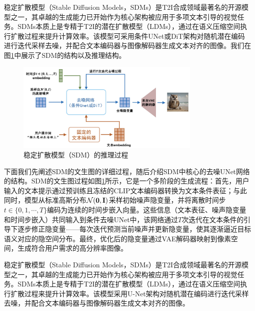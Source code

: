 \documentclass[11pt,a4paper,UTF8]{ctexart}
\begin{document}
稳定扩散模型（Stable Diffusion Models，SDMs）\cite{rombach2022high}是T2I合成领域最著名的开源模型之一，其卓越的生成能力已开始作为核心架构被应用于多项文本引导的视觉任务\cite{blattmann2023videoldm,brooks2023instructpix2pix,wang2023score,zhang2023adding}。SDMs本质上是专精于T2I的潜在扩散模型（LDMs）\cite{rombach2022high}，通过在语义压缩空间执行扩散过程\cite{ho2022classifier,liu2021pseudo,song2020denoising}来提升计算效率。该模型可采用条件UNet或DiT架构对随机潜在编码进行迭代采样去噪，并配合文本编码器\cite{radford2021learning}与图像解码器\cite{esser2021taming,van2017neural}生成文本对齐的图像。我们在图\ref{fig:sdm}中展示了SDM的结构以及推理结构。

\begin{figure}[htbp]
\centering
\includegraphics[width=0.8\textwidth]{img/SDM.jpg}
\caption{稳定扩散模型（SDM）的推理过程}
\label{fig:sdm}
\end{figure}

下面我们先阐述SDM的文生图的详细过程，随后介绍SDM中核心的去噪UNet网络的结构。SDM的文生图过程如图\ref{fig:sdm}所示，它是一个多阶段的生成流程：首先，用户输入的文本提示通过预训练且冻结的CLIP文本编码器转换为文本条件表征；与此同时，模型从标准高斯分布$\mathcal{N}(\mathbf{0},\mathbf{I})$采样初始噪声隐变量，并将离散时间步$t\in\{0,1,\cdots,T\}$编码为连续的时间步嵌入向量。这些信息（文本表征、噪声隐变量和时间步嵌入）共同输入到条件去噪UNet中，该网络通过$T$次迭代在文本条件的引导下逐步修正隐变量——每次迭代预测当前噪声并更新隐变量，使其逐渐逼近目标语义对应的隐空间分布。最终，优化后的隐变量通过VAE解码器映射到像素空间，生成符合用户需求的高分辨率图像。



\newpage

\iffalse
稳定扩散模型（Stable Diffusion Models，SDMs）\cite{rombach2022high}是T2I合成领域最著名的开源模型之一，其卓越的生成能力已开始作为核心架构被应用于多项文本引导的视觉任务\cite{blattmann2023videoldm,brooks2023instructpix2pix,wang2023score,zhang2023adding}。SDMs本质上是专精于T2I的潜在扩散模型（LDMs）\cite{rombach2022high}，通过在语义压缩空间执行扩散过程\cite{ho2022classifier,liu2021pseudo,song2020denoising}来提升计算效率。该模型采用U-Net架构\cite{ronneberger2015u,dhariwal2021diffusion}对随机潜在编码进行迭代采样去噪，并配合文本编码器\cite{radford2021learning}与图像解码器\cite{esser2021taming,van2017neural}生成文本对齐的图像。
\end{document}
